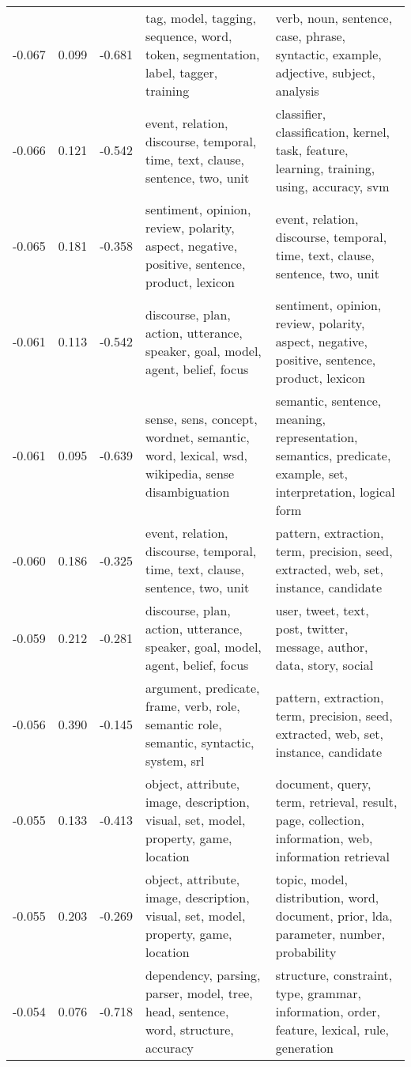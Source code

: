 \begin{tabular}{cccp{5cm}p{5cm}}
-0.067 & 0.099 & -0.681 & tag, model, tagging, sequence, word, token, segmentation, label, tagger, training & verb, noun, sentence, case, phrase, syntactic, example, adjective, subject, analysis \\
-0.066 & 0.121 & -0.542 & event, relation, discourse, temporal, time, text, clause, sentence, two, unit & classifier, classification, kernel, task, feature, learning, training, using, accuracy, svm \\
-0.065 & 0.181 & -0.358 & sentiment, opinion, review, polarity, aspect, negative, positive, sentence, product, lexicon & event, relation, discourse, temporal, time, text, clause, sentence, two, unit \\
-0.061 & 0.113 & -0.542 & discourse, plan, action, utterance, speaker, goal, model, agent, belief, focus & sentiment, opinion, review, polarity, aspect, negative, positive, sentence, product, lexicon \\
-0.061 & 0.095 & -0.639 & sense, sens, concept, wordnet, semantic, word, lexical, wsd, wikipedia, sense disambiguation & semantic, sentence, meaning, representation, semantics, predicate, example, set, interpretation, logical form \\
-0.060 & 0.186 & -0.325 & event, relation, discourse, temporal, time, text, clause, sentence, two, unit & pattern, extraction, term, precision, seed, extracted, web, set, instance, candidate \\
-0.059 & 0.212 & -0.281 & discourse, plan, action, utterance, speaker, goal, model, agent, belief, focus & user, tweet, text, post, twitter, message, author, data, story, social \\
-0.056 & 0.390 & -0.145 & argument, predicate, frame, verb, role, semantic role, semantic, syntactic, system, srl & pattern, extraction, term, precision, seed, extracted, web, set, instance, candidate \\
-0.055 & 0.133 & -0.413 & object, attribute, image, description, visual, set, model, property, game, location & document, query, term, retrieval, result, page, collection, information, web, information retrieval \\
-0.055 & 0.203 & -0.269 & object, attribute, image, description, visual, set, model, property, game, location & topic, model, distribution, word, document, prior, lda, parameter, number, probability \\
-0.054 & 0.076 & -0.718 & dependency, parsing, parser, model, tree, head, sentence, word, structure, accuracy & structure, constraint, type, grammar, information, order, feature, lexical, rule, generation \\

\end{tabular}

